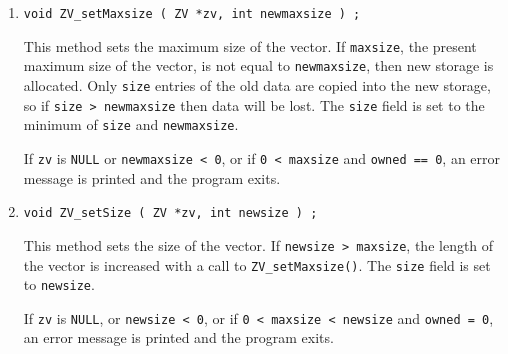 \begin{enumerate}
\item
\begin{verbatim}
void ZV_setMaxsize ( ZV *zv, int newmaxsize ) ;
\end{verbatim}
This method sets the maximum size of the vector.
If {\tt maxsize}, the present maximum size of the vector,
is not equal to {\tt newmaxsize}, then new storage is allocated.
Only {\tt size}
entries of the old data are copied into the new
storage, so if {\tt size > newmaxsize} then data will be lost.
The {\tt size} field is set to the minimum of {\tt size} 
and {\tt newmaxsize}.
\par {}
If {\tt zv} is {\tt NULL} or {\tt newmaxsize < 0},
or if {\tt 0 < maxsize} and {\tt owned == 0},
an error message is printed and the program exits.
\item
\begin{verbatim}
void ZV_setSize ( ZV *zv, int newsize ) ;
\end{verbatim}
This method sets the size of the vector.
If {\tt newsize > maxsize}, the length of the vector is increased
with a call to {\tt ZV\_setMaxsize()}.
The {\tt size} field is set to {\tt newsize}.
\par {}
If {\tt zv} is {\tt NULL}, or {\tt newsize < 0},
or if {\tt 0 < maxsize < newsize} and {\tt owned = 0},
an error message is printed and the program exits.
\end{enumerate}
\par
